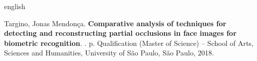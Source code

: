 % 
% 
\begin{resumo}[Abstract]
\begin{otherlanguage*}{english}

% 
%
%
%
\begin{flushleft}
Targino, Jonas Mendonça. \textbf{Comparative analysis of techniques for detecting and reconstructing partial occlusions in face images for biometric recognition}. \imprimirdata. \pageref{LastPage} p. Qualification (Master of Science) – School of Arts, Sciences and Humanities, University of São Paulo, São Paulo, 2018. 
\end{flushleft}


\end{otherlanguage*}
\end{resumo}

